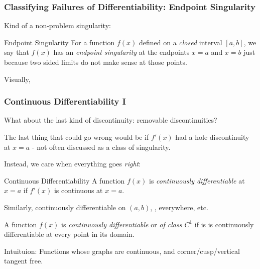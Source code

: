 \documentclass{ltx-talk}
\begin{document}
\begin{frame}
  \frametitle{Classifying Failures of Differentiability: Endpoint Singularity}
  Kind of a non-problem singularity: \pause
  \begin{block}{Endpoint Singularity}
    For a function $f(x)$ defined on a \textit{closed} interval $[a,b]$, \pause
    we say that $f(x)$ has an \textit{endpoint singularity} at the endpoints
    $x = a$ and $x = b$ \pause just because two sided limits do not make sense at those points.
  \end{block} \pause
  Visually, 
  \vfill
\end{frame}

\begin{frame}
  \frametitle{Continuous Differentiability I}
  What about the last kind of discontinuity: \pause removable discontinuities?

  The last thing that could go wrong would be if $f'(x)$ had a hole
  discontinuity at $x = a$ \pause - not often discussed as a class of singularity. \pause

  Instead, we care when everything goes \textit{right}: \pause

  \begin{block}{Continuous Differentiability}
    A function $f(x)$ is \textit{continuously differentiable} at $x = a$ if \pause $f'(x)$ is continuous at $x = a$. \pause

    Similarly, continuously differentiable on $(a,b)$, \pause, everywhere, etc. \pause

    A function $f(x)$ is \textit{continuously differentiable} or \textit{of class $C^1$} if is is continuously differentiable at every point in its domain.
  \end{block} \pause

  Intuituion: Functions whose graphs are continuous, and corner/cusp/vertical tangent free.
\end{frame}
\end{document}
